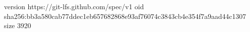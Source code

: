 version https://git-lfs.github.com/spec/v1
oid sha256:bb3a580cab77ddec1eb657682868e93af76074c3843cb4e354f7a9aad44c1307
size 3920
